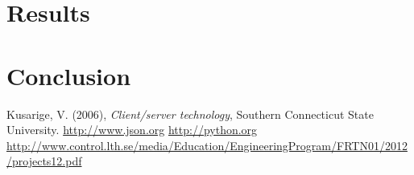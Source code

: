 \documentclass{article}
\begin{document}
\section{Results}

\section{Conclusion}

\newpage

\begin{thebibliography}{9}
Kusarige, V. (2006), \emph{Client/server technology}, Southern Connecticut State University.
\url{http://www.json.org}
\url{http://python.org}
\url{http://www.control.lth.se/media/Education/EngineeringProgram/FRTN01/2012/projects12.pdf}
\end{thebibliography}
\end{document}

